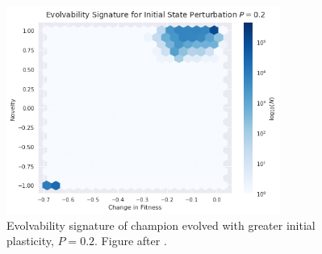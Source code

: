 \begin{figure}
    \centering
    \includegraphics[width=0.8\textwidth]{img/es_p0_2}
 	\captionsetup{singlelinecheck=off,justification=raggedright}
  	\caption{Evolvability signature of champion evolved with greater initial plasticity, $P=0.2$. Figure after \cite{Tarapore2015EvolvabilityBenchmarks}.}
    \label{fig:es_p0_2}
\end{figure}